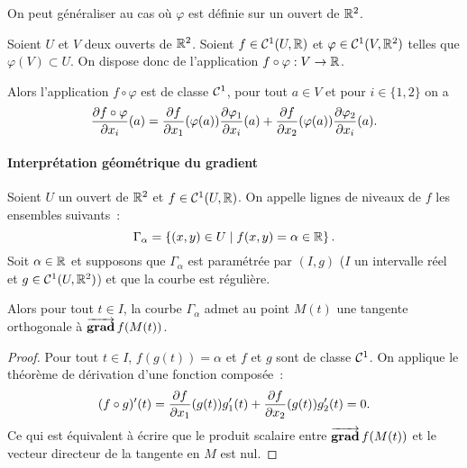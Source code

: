 %
On peut généraliser au cas où \(\varphi\) est définie sur un ouvert de
\(\mathbb{R}^2\).
%
\begin{theo}
  Soient \(U\) et \(V\) deux ouverts de \(\mathbb{R}^2\). Soient \(f \in
  \mathcal{C}^{1}(U, \mathbb{R})\) et \(\varphi \in \mathcal{C}^{1}(V, \mathbb{R}^2)\) telles que
  \(\varphi(V) \subset U\). On dispose donc de l'application \(f \circ
  \varphi : V \rightarrow \mathbb{R}\).

  Alors l'application \(f\circ \varphi\) est de classe \(\mathcal{C}^{1}\),
  pour tout \(a \in V\) et pour \(i \in \{1, 2\}\) on a
  \begin{equation}
    \dfrac{\partial{} f\circ \varphi}{\partial{} x_i}(a) =
    \dfrac{\partial{} f}{\partial{} x_1}(\varphi(a))\dfrac{\partial{} \varphi_1}{\partial{} x_i}(a) +
    \dfrac{\partial{} f}{\partial{} x_2}(\varphi(a))\dfrac{\partial{} \varphi_2}{\partial{} x_i}(a).
  \end{equation}
\end{theo}

\paragraph{Interprétation géométrique du gradient}

\begin{prop}
  Soient \(U\) un ouvert de \(\mathbb{R}^2\) et \(f \in \mathcal{C}^{1}(U, \mathbb{R})\). On
  appelle lignes de niveaux de \(f\) les ensembles suivants~:
  \begin{equation}
    \Gamma_\alpha = \left\{(x,y) \in U\mathrel{}\middle|\mathrel{}f(x,y)=\alpha \in \mathbb{R}\right\}.
  \end{equation}
  Soit \(\alpha \in \mathbb{R}\) et supposons que \(\Gamma_\alpha\) est
  paramétrée par \((I, g)\) (\(I\) un intervalle réel et \(g \in
  \mathcal{C}^{1}(U, \mathbb{R}^2)\)) et que la courbe est régulière.

  Alors pour tout \(t \in I\), la courbe \(\Gamma_\alpha\) admet au
  point \(M(t)\) une tangente orthogonale à \(\operatorname{\overrightarrow{\mathbf{grad}}} f(M(t))\).
\end{prop}
\begin{proof}
  Pour tout \(t \in I\), \(f(g(t))=\alpha\) et \(f\) et \(g\) sont de
  classe \(\mathcal{C}^{1}\). On applique le théorème de dérivation d'une
  fonction composée~:
  \begin{equation}
    (f \circ g)'(t) = \dfrac{\partial{} f}{\partial{} x_1}(g(t))g_1'(t) +
    \dfrac{\partial{} f}{\partial{} x_2}(g(t))g_2'(t) = 0.
  \end{equation}
  Ce qui est équivalent à écrire que le produit scalaire entre \(\operatorname{\overrightarrow{\mathbf{grad}}}
  f(M(t))\) et le vecteur directeur de la tangente en \(M\) est nul.
\end{proof}

